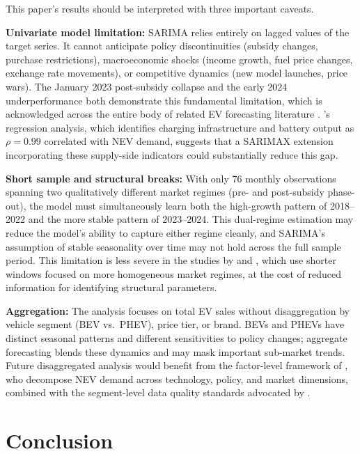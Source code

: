 \documentclass[12pt]{article}
\begin{document}
This paper's results should be interpreted with three important caveats.

\textbf{Univariate model limitation:} SARIMA relies entirely on lagged values of the target series. It cannot anticipate policy discontinuities (subsidy changes, purchase restrictions), macroeconomic shocks (income growth, fuel price changes, exchange rate movements), or competitive dynamics (new model launches, price wars). The January 2023 post-subsidy collapse and the early 2024 underperformance both demonstrate this fundamental limitation, which is acknowledged across the entire body of related EV forecasting literature \citep{chen2025, ge2024, yang2024, liang2025}. \citet{yang2024}'s regression analysis, which identifies charging infrastructure and battery output as $\rho = 0.99$ correlated with NEV demand, suggests that a SARIMAX extension incorporating these supply-side indicators could substantially reduce this gap.

\textbf{Short sample and structural breaks:} With only 76 monthly observations spanning two qualitatively different market regimes (pre- and post-subsidy phase-out), the model must simultaneously learn both the high-growth pattern of 2018--2022 and the more stable pattern of 2023--2024. This dual-regime estimation may reduce the model's ability to capture either regime cleanly, and SARIMA's assumption of stable seasonality over time may not hold across the full sample period. This limitation is less severe in the studies by \citet{chen2025} and \citet{liang2025}, which use shorter windows focused on more homogeneous market regimes, at the cost of reduced information for identifying structural parameters.

\textbf{Aggregation:} The analysis focuses on total EV sales without disaggregation by vehicle segment (BEV vs.\ PHEV), price tier, or brand. BEVs and PHEVs have distinct seasonal patterns and different sensitivities to policy changes; aggregate forecasting blends these dynamics and may mask important sub-market trends. Future disaggregated analysis would benefit from the factor-level framework of \citet{ge2024}, who decompose NEV demand across technology, policy, and market dimensions, combined with the segment-level data quality standards advocated by \citet{yang2024}.

\section{Conclusion}
\label{sec:conclusion}
\end{document}
